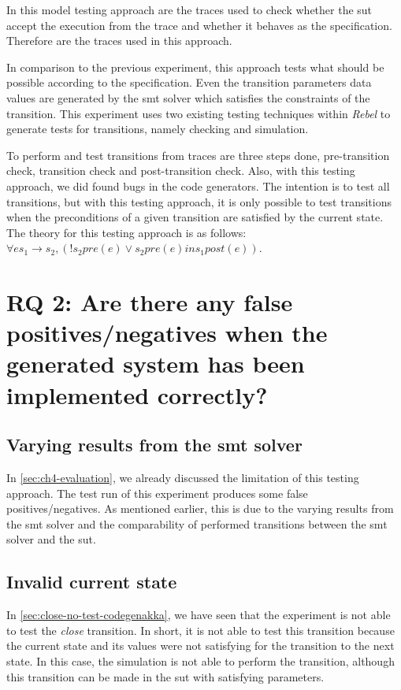 In this model testing approach are the traces used to check whether the \gls{sut} accept the execution from the trace and whether it behaves as the specification. Therefore are the traces used in this approach.

In comparison to the previous experiment, this approach tests what should be possible according to the specification. Even the transition parameters data values are generated by the \gls{smt} solver which satisfies the constraints of the transition. This experiment uses two existing testing techniques within \textit{Rebel} to generate tests for transitions, namely checking and simulation.

To perform and test transitions from traces are three steps done, pre-transition check, transition check and post-transition check. Also, with this testing approach, we did found bugs in the code generators. The intention is to test all transitions, but with this testing approach, it is only possible to test transitions when the preconditions of a given transition are satisfied by the current state. The theory for this testing approach is as follows: $\forall e s_{1} \to s_{2}, (! s_{2} pre(e) \lor s_{2} pre(e) in s_{1} post(e))$.

\section{RQ 2: Are there any false positives/negatives when the generated system has been implemented correctly?}

\subsection{Varying results from the \gls{smt} solver}
In \autoref{sec:ch4-evaluation}, we already discussed the limitation of this testing approach. The test run of this experiment produces some false positives/negatives. As mentioned earlier, this is due to the varying results from the \gls{smt} solver and the comparability of performed transitions between the \gls{smt} solver and the \gls{sut}.


\subsection{Invalid current state}
In \autoref{sec:close-no-test-codegenakka}, we have seen that the experiment is not able to test the \textit{close} transition. In short, it is not able to test this transition because the current state and its values were not satisfying for the transition to the next state. In this case, the simulation is not able to perform the transition, although this transition can be made in the \gls{sut} with satisfying parameters.

